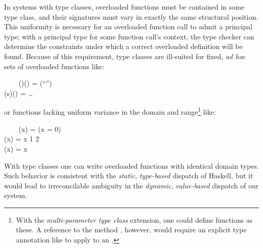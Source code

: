 \documentclass[10pt]{sigplanconf}
\begin{document}

In systems with type classes, overloaded functions must be contained in some
type class, and their signatures must vary in exactly the same structural
position. This uniformity is necessary for an overloaded function call to
admit a principal type; with a principal type for some function call's context,
the type checker can determine the constraints under which a correct overloaded
definition will be found. Because of this requirement, type classes are ill-suited
for fixed, \emph{ad hoc} sets of overloaded functions like:
\begin{FortressCode}
{\tt ~~~~}\+(\ultrathin)\COLON (\ultrathin) = (\hbox{\rm{}``\verythin''}) \\
    (s\COLON {})\COLON (\ultrathin) = \ldots\-
\end{FortressCode}
or functions lacking uniform variance in the domain and range\footnote{With the
\emph{multi-parameter type class} extension, one could define functions as these.
A reference to the method , however, would require an explicit type
annotation like  to apply to an .} like:
\begin{FortressCode}
{\tt ~~~~}\+(x\COLON {})\COLON {} = (x = 0) \\
    (x\COLON {})\COLON {} =\;  x  1  2  \\
    (x\COLON {})\COLON {} = x\-
\end{FortressCode}
With type classes one can write overloaded functions with identical domain
types. Such behavior is consistent with the \emph{static}, \emph{type-based}
dispatch of Haskell, but it would lead to irreconcilable ambiguity in the
\emph{dynamic}, \emph{value-based} dispatch of our system.
\end{document}
